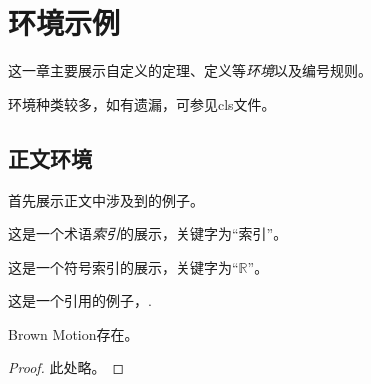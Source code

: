 \chapter{环境示例}
这一章主要展示自定义的定理、定义等\emph{环境}以及编号规则。
\begin{tips}
环境种类较多，如有遗漏，可参见cls文件。
\end{tips}
\section{正文环境}
首先展示正文中涉及到的例子。\par
这是一个术语\emph{索引}的展示，关键字为“索引”。\par
{}
这是一个符号索引的展示，关键字为“$\mathbb{R}$”。\par
{}
这是一个引用的例子，\cite{AM10}.
\begin{theorem}
    Brown Motion存在。
\end{theorem}

\begin{proof}
    此处略。
\end{proof}

